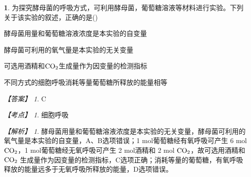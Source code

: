 \documentclass[UTF8, 10pt, a4paper, oneside]{ctexart}
\theoremstyle{definition}
\newtheorem{exercise}{}
\theoremstyle{remark}
\newtheorem*{answer}{【答案】}
\newtheorem*{point}{【考点】}      %
\newtheorem*{explanation}{【解析】}     %
\theoremstyle{plain}
\begin{document}
\begin{exercise}
    为探究酵母菌的呼吸方式，可利用酵母菌，葡萄糖溶液等材料进行实验。下列关于该实验的叙述，正确的是\quad(\quad)
    \begin{adjustwidth}{2em}{}
        \begin{asparaenum}[A. ]
            \item 酵母菌用量和葡萄糖溶液浓度是本实验的自变量
            \item 酵母菌可利用的氧气量是本实验的无关变量
            \item 可选用酒精和$\ce{CO2}$生成量作为因变量的检测指标
            \item 不同方式的细胞呼吸消耗等量葡萄糖所释放的能量相等
        \end{asparaenum}
    \end{adjustwidth}
    \begin{answer}
        C
    \end{answer}
    \begin{point}
        细胞呼吸
    \end{point}
    \begin{explanation}
        酵母菌用量和葡萄糖溶液浓度是本实验的无关变量，酵母菌可利用的氧气量是本实验的自变量，A、B选项错误；1 mol葡萄糖经有氧呼吸可产生 6 mol $\ce{CO2}$，1 mol葡萄糖经无氧呼吸可产生 2 mol酒精和 2 mol $\ce{CO2}$，故可选用酒精和 $\ce{CO2}$ 生成量作为因变量的检测指标，C选项正确；消耗等量的葡萄糖，有氧呼吸释放的能量远多于无氧呼吸所释放的能量，D选项错误。
    \end{explanation}
\end{exercise}
\end{document}
